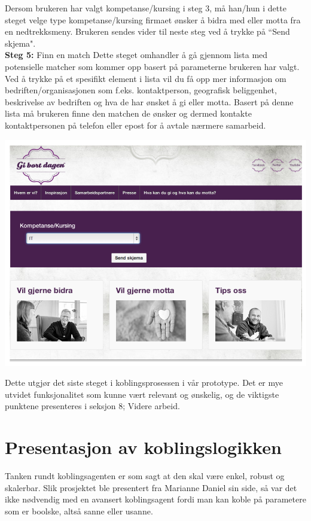 Dersom brukeren har valgt kompetanse/kursing i steg 3, må han/hun i dette steget velge type kompetanse/kursing firmaet ønsker å bidra med eller motta fra en nedtrekksmeny. Brukeren sendes vider til neste steg ved å trykke på ``Send skjema".\\

{\bf Steg 5:} Finn en match
Dette steget omhandler å gå gjennom lista med potensielle matcher som kommer opp basert på parameterne brukeren har valgt. Ved å trykke på et spesifikt element i lista vil du få opp mer informasjon om bedriften/organisasjonen som f.eks. kontaktperson, geografisk beliggenhet, beskrivelse av bedriften og hva de har ønsket å gi eller motta. Basert på denne lista må brukeren finne den matchen de ønsker og dermed kontakte kontaktpersonen på telefon eller epost for å avtale nærmere samarbeid.\\
\begin{center}
\includegraphics[clip=true, width=1 \textwidth,
trim=0cm 0cm 0cm 0cm]{kompetanse.png}
\label{fig:match}
\end{center}

Dette utgjør det siste steget i koblingsprosessen i vår prototype. Det er mye utvidet funksjonalitet som kunne vært relevant og ønskelig, og de viktigste punktene presenteres i seksjon 8; Videre arbeid.\\

\section{Presentasjon av koblingslogikken}
Tanken rundt koblingsagenten er som sagt at den skal være enkel, robust og skalerbar. Slik prosjektet ble presentert fra Marianne Daniel sin side, så var det ikke nødvendig med en avansert koblingsagent fordi man kan koble på parametere som er boolske, altså sanne eller usanne.\\

